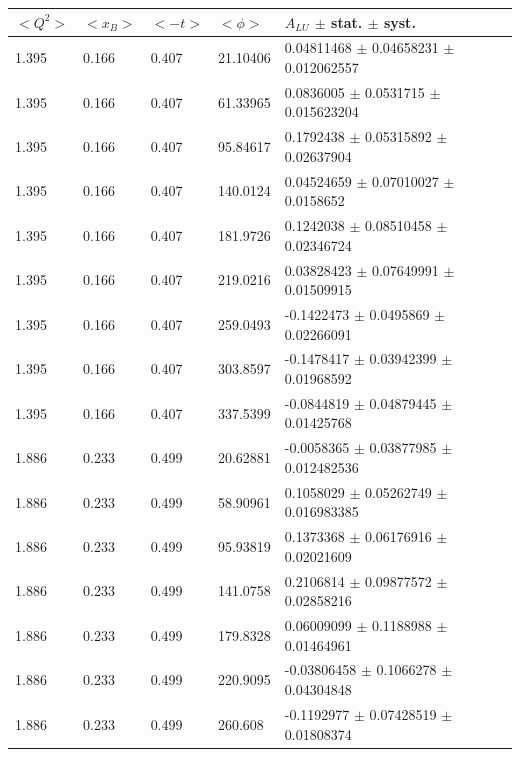 \begin{table}[!h]
   \begin{center}
      \begin{tabular}{||l|l|l|l|l||}
         \hline
 $<Q^{2}>$ & $<x_{B}>$ & $<-t>$ & $<\phi>$ & $A_{LU}$ $\pm$ stat. $\pm$ syst.\\
 \hline  
  1.395 & 0.166 & 0.407  &   21.10406  &  0.04811468 $\pm$  0.04658231  $\pm$  0.012062557     \\
  1.395 & 0.166 & 0.407  &   61.33965  &  0.0836005  $\pm$  0.0531715   $\pm$  0.015623204     \\
  1.395 & 0.166 & 0.407  &   95.84617  &  0.1792438  $\pm$  0.05315892  $\pm$  0.02637904      \\
  1.395 & 0.166 & 0.407  &   140.0124  &  0.04524659 $\pm$  0.07010027  $\pm$  0.0158652       \\
  1.395 & 0.166 & 0.407  &   181.9726  &  0.1242038  $\pm$  0.08510458  $\pm$  0.02346724      \\
  1.395 & 0.166 & 0.407  &   219.0216  &  0.03828423 $\pm$  0.07649991  $\pm$  0.01509915      \\
  1.395 & 0.166 & 0.407  &   259.0493  &  -0.1422473 $\pm$  0.0495869   $\pm$  0.02266091      \\
  1.395 & 0.166 & 0.407  &   303.8597  &  -0.1478417 $\pm$  0.03942399  $\pm$  0.01968592      \\
  1.395 & 0.166 & 0.407  &   337.5399  &  -0.0844819 $\pm$  0.04879445  $\pm$  0.01425768      \\
 \hline                                                                      
  1.886 & 0.233 & 0.499 &    20.62881  &  -0.0058365 $\pm$  0.03877985  $\pm$  0.012482536     \\
  1.886 & 0.233 & 0.499 &    58.90961  &  0.1058029  $\pm$  0.05262749  $\pm$  0.016983385     \\
  1.886 & 0.233 & 0.499 &    95.93819  &  0.1373368  $\pm$  0.06176916  $\pm$  0.02021609      \\
  1.886 & 0.233 & 0.499 &    141.0758  &  0.2106814  $\pm$  0.09877572  $\pm$  0.02858216      \\
  1.886 & 0.233 & 0.499 &    179.8328  &  0.06009099 $\pm$  0.1188988   $\pm$  0.01464961      \\
  1.886 & 0.233 & 0.499 &    220.9095  &  -0.03806458 $\pm$  0.1066278   $\pm$  
 0.04304848      \\
  1.886 & 0.233 & 0.499 &    260.608   &  -0.1192977 $\pm$  0.07428519  $\pm$  0.01808374      \\

\end{tabular}
\end{center}
\end{table}
